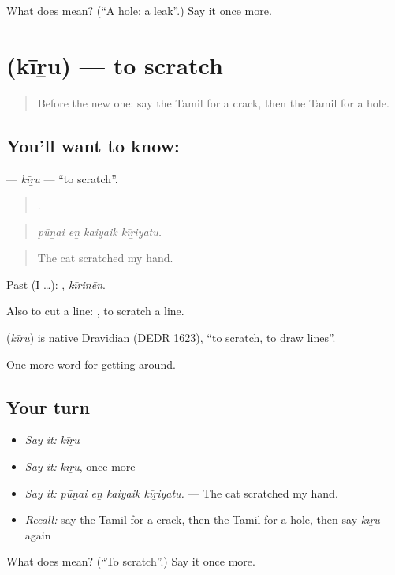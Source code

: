 \begin{tcolorbox}[breakable,colback=teal!4,colframe=teal!35!black,title={Before you move on}]
What does  mean? (\textquotedblleft{}A hole; a leak\textquotedblright{}.) Say it once more.
\end{tcolorbox}
\section[\texorpdfstring{\ta{கீறு} (kīṟu)}{கீறு (kīṟu)}]{ (kīṟu) — to scratch}

\label{lesson:TA-C443-kiru}



\begin{quote}
Before the new one: say the Tamil for a crack, then the Tamil for a hole.
\end{quote}

\subsection*{You'll want to know: }
\textbf{} — \emph{kīṟu} — \textquotedblleft{}to scratch\textquotedblright{}.

\begin{quote}
   .
\end{quote}

\begin{quote}
\emph{pūṉai eṉ kaiyaik kīṟiyatu.}
\end{quote}

\begin{quote}
The cat scratched my hand.
\end{quote}

Past (I …): , \emph{kīṟiṉēṉ}.

Also to cut a line:  , to scratch a line.

\begin{cousinweb}
\textbf{} (\emph{kīṟu}) is native Dravidian (DEDR 1623), \textquotedblleft{}to scratch, to draw lines\textquotedblright{}.
\end{cousinweb}

\begin{grammarlens}[title={What you've built}]
One more word for getting around.
\end{grammarlens}

\subsection*{Your turn}
\begin{itemize}
\raggedright
  \item \emph{Say it:} \emph{kīṟu}
  \item \emph{Say it:} \emph{kīṟu}, once more
  \item \emph{Say it:} \emph{pūṉai eṉ kaiyaik kīṟiyatu.} — The cat scratched my hand.
  \item \emph{Recall:} say the Tamil for a crack, then the Tamil for a hole, then say \emph{kīṟu} again
\end{itemize}

\begin{tcolorbox}[breakable,colback=teal!4,colframe=teal!35!black,title={Before you move on}]
What does  mean? (\textquotedblleft{}To scratch\textquotedblright{}.) Say it once more.
\end{tcolorbox}
